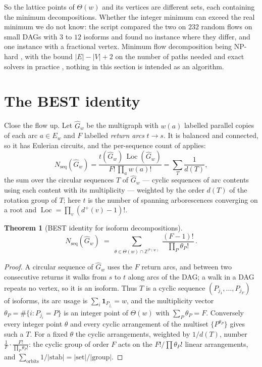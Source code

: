 \documentclass[11pt]{article}
\theoremstyle{plain}
\newtheorem{theorem}{Theorem}
\theoremstyle{definition}
\theoremstyle{remark}
\newcommand{\Z}{\mathbb{Z}}
\newcommand{\Loc}{\operatorname{Loc}}
\newcommand{\Nseq}{N_{\mathrm{seq}}}
\newcommand{\Th}{\Theta}
\newcommand{\Ghat}{\widehat G}
\begin{document}
So the lattice points of $\Th(w)$ and its vertices are different sets, each containing the
minimum decompositions. Whether the integer minimum can exceed the real minimum we do not
know: the script compared the two on $232$ random flows on small DAGs with $3$ to $12$
isoforms and found no instance where they differ, and one instance with a fractional
vertex. Minimum flow decomposition being NP-hard \cite{HHKS12}, with the bound
$|E|-|V|+2$ on the number of paths needed \cite{VCCM08} and exact solvers in practice
\cite{KKO18,DT22}, nothing in this section is intended as an algorithm.

\section{The BEST identity}\label{sec:best}

Close the flow up. Let $\Ghat_w$ be the multigraph with $w(a)$ labelled parallel copies of
each arc $a\in E_w$ and $F$ labelled \emph{return arcs} $t\to s$. It is balanced and
connected, so it has Eulerian circuits, and the per-sequence count of \cite{Bio8} applies:
\[
  \Nseq(\Ghat_w)=\frac{t(\Ghat_w)\,\Loc(\Ghat_w)}{F!\,\prod_{a}w(a)!}
  =\sum_{T}\frac1{d(T)},
\]
the sum over the circular sequences $T$ of $\Ghat_w$ --- cyclic sequences of arc contents
using each content with its multiplicity --- weighted by the order $d(T)$ of the rotation
group of $T$; here $t$ is the number of spanning arborescences converging on a root and
$\Loc=\prod_v(d^+(v)-1)!$.

\begin{theorem}[BEST identity for isoform decompositions]\label{thm:best}
\[
  \Nseq(\Ghat_w)\;=\;\sum_{\theta\in\Th(w)\cap\Z^{\mathcal P(w)}}\ \frac{(F-1)!}{\prod_{P}\theta_P!}\,.
\]
\end{theorem}

\begin{proof}
A circular sequence of $\Ghat_w$ uses the $F$ return arcs, and between two consecutive
returns it walks from $s$ to $t$ along arcs of the DAG; a walk in a DAG repeats no vertex,
so it is an isoform. Thus $T$ is a cyclic sequence $(P_{j_1},\dots,P_{j_F})$ of isoforms,
its arc usage is $\sum_i\mathbf 1_{P_{j_i}}=w$, and the multiplicity vector
$\theta_P=\#\{i:P_{j_i}=P\}$ is an integer point of $\Th(w)$ with $\sum_P\theta_P=F$.
Conversely every integer point $\theta$ and every cyclic arrangement of the multiset
$\{P^{\theta_P}\}$ gives such a $T$. For a fixed $\theta$ the cyclic arrangements, weighted by
$1/d(T)$, number $\frac1F\cdot\frac{F!}{\prod_P\theta_P!}$: the cyclic group of order $F$
acts on the $F!/\prod\theta_P!$ linear arrangements, and $\sum_{\text{orbits}}1/|\mathrm{stab}|
=|\text{set}|/|\text{group}|$.
\end{proof}
\end{document}
